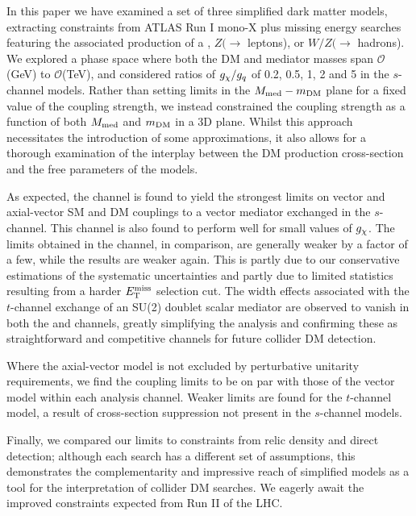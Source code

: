 
In this paper we have examined a set of three simplified dark matter models, extracting constraints from ATLAS Run I mono-X plus missing energy searches featuring the associated production of a \monojet, $Z(\rightarrow$ leptons), or $W/Z (\rightarrow$ hadrons). We explored a phase space where both the DM and mediator masses span $\mathcal{O}$(GeV) to $\mathcal{O}$(TeV), and considered ratios of $g_{\chi} / g_q$ of 0.2, 0.5, 1, 2 and 5 in the $s$-channel models. 
Rather than setting limits in the $M_{\mathrm{med}} - m_{\mathrm{DM}}$ plane for a fixed value of the coupling strength, we instead constrained the coupling strength as a function of both $M_{\mathrm{med}}$ and $m_{\mathrm{DM}}$ in a 3D plane. Whilst this approach necessitates the introduction of some approximations, it also allows for a thorough examination of the interplay between the DM production cross-section and the free parameters of the models.

As expected, the \monojet channel is found to yield the strongest limits on vector and axial-vector SM and DM couplings to a vector mediator exchanged in the $s$-channel. This channel is also found to perform well for small values of $g_{\chi}$. The limits obtained in the \monoZ channel, in comparison, are generally weaker by a factor of a few, while the \monoWZ results are weaker again. This is partly due to our conservative estimations of the systematic uncertainties and partly due to limited statistics resulting from a harder $E_{\mathrm{T}}^{\mathrm{miss}}$ selection cut. The width effects associated with the $t$-channel exchange of an SU(2) doublet scalar mediator are observed to vanish in both the \monoZ and \monoWZ channels, greatly simplifying the analysis and confirming these as straightforward and competitive channels for future collider DM detection.

Where the axial-vector model is not excluded by perturbative unitarity requirements, we find the coupling limits to be on par with those of the vector model within each analysis channel. Weaker limits are found for the $t$-channel model, a result of cross-section suppression not present in the $s$-channel models.

Finally, we compared our limits to constraints from relic density and direct detection; although each search has a different set of assumptions, this demonstrates the complementarity and impressive reach of simplified models as a tool for the interpretation of collider DM searches. We eagerly await the improved constraints expected from Run II of the LHC.

